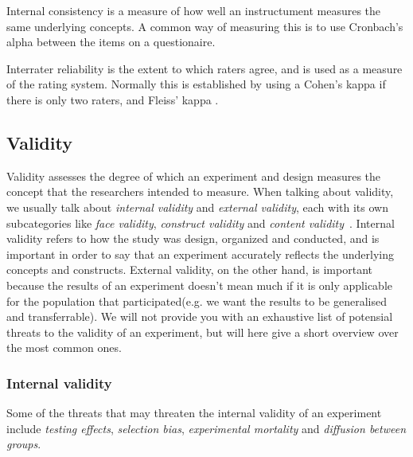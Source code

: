 	\bigskip\noindent
	Internal consistency is a measure of how well an instructument measures the same underlying concepts. A common way of measuring this is to use Cronbach's alpha between the items on a questionaire.
	
	\bigskip\noindent
	Interrater reliability is the extent to which raters agree, and is used as a measure of the rating system. Normally this is established by using a Cohen's kappa if there is only two raters, and Fleiss' kappa \cite{gwet2001handbook, shrout1979intraclass}.
	
\subsection*{Validity}
	Validity assesses the degree of which an experiment and design measures the concept that the researchers intended to measure.
	When talking about validity, we usually talk about \textit{internal validity} and \textit{external validity}, each with its own subcategories like \textit{face validity}, \textit{construct validity} and \textit{content validity}~\cite{colostateReliability,laerdQuality}.
	Internal validity refers to how the study was design, organized and conducted, and is important in order to say that an experiment
 accurately reflects the underlying concepts and constructs. 
External validity, on the other hand, is important because the results of an experiment doesn't mean much if it is only applicable for the population that participated(e.g. we want the results to be generalised and transferrable).
	We will not provide you with an exhaustive list of potensial threats to the validity of an experiment, but will here give a short overview over the most common ones.
	
	\subsubsection{Internal validity}
	Some of the threats that may threaten the internal validity of an experiment include \textit{testing effects}, \textit{selection bias}, \textit{experimental mortality} and \textit{diffusion between groups}.
	
